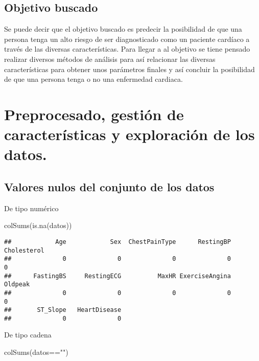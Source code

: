 \documentclass[
]{article}
\newenvironment{Shaded}{\begin{snugshade}}{\end{snugshade}}
\newcommand{\FunctionTok}[1]{\textcolor[rgb]{0.94,0.94,0.56}{#1}}
\newcommand{\NormalTok}[1]{\textcolor[rgb]{0.80,0.80,0.80}{#1}}
\newcommand{\SpecialCharTok}[1]{\textcolor[rgb]{0.86,0.64,0.64}{#1}}
\newcommand{\StringTok}[1]{\textcolor[rgb]{0.80,0.58,0.58}{#1}}
\begin{document}
\hypertarget{objetivo-buscado}{%
\subsection{Objetivo buscado}\label{objetivo-buscado}}

Se puede decir que el objetivo buscado es predecir la posibilidad de que
una persona tenga un alto riesgo de ser diagnosticado como un paciente
cardíaco a través de las diversas características. Para llegar a al
objetivo se tiene pensado realizar diversos métodos de análisis para así
relacionar las diversas características para obtener unos parámetros
finales y así concluir la posibilidad de que una persona tenga o no una
enfermedad cardiaca.

\hypertarget{preprocesado-gestiuxf3n-de-caracteruxedsticas-y-exploraciuxf3n-de-los-datos.}{%
\section{Preprocesado, gestión de características y exploración de los
datos.}\label{preprocesado-gestiuxf3n-de-caracteruxedsticas-y-exploraciuxf3n-de-los-datos.}}

\hypertarget{valores-nulos-del-conjunto-de-los-datos}{%
\subsection{Valores nulos del conjunto de los
datos}\label{valores-nulos-del-conjunto-de-los-datos}}

De tipo numérico

\begin{Shaded}
\begin{Highlighting}[]
\FunctionTok{colSums}\NormalTok{(}\FunctionTok{is.na}\NormalTok{(datos))}
\end{Highlighting}
\end{Shaded}

\begin{verbatim}
##            Age            Sex  ChestPainType      RestingBP    Cholesterol 
##              0              0              0              0              0 
##      FastingBS     RestingECG          MaxHR ExerciseAngina        Oldpeak 
##              0              0              0              0              0 
##       ST_Slope   HeartDisease 
##              0              0
\end{verbatim}

De tipo cadena

\begin{Shaded}
\begin{Highlighting}[]
\FunctionTok{colSums}\NormalTok{(datos}\SpecialCharTok{==}\StringTok{""}\NormalTok{)}
\end{Highlighting}
\end{Shaded}
\end{document}
